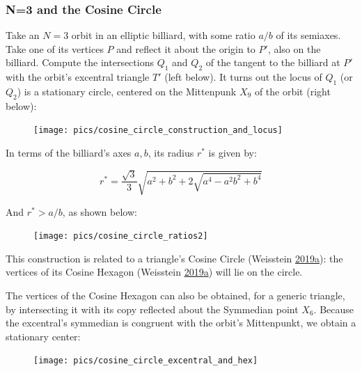 \documentclass[]{article}
\begin{document}
\hypertarget{n3-and-the-cosine-circle}{%
\subsubsection{N=3 and the Cosine Circle}\label{n3-and-the-cosine-circle}}

Take an \(N=3\) orbit in an elliptic billiard, with some ratio \(a/b\) of its semiaxes. Take one of its vertices \(P\) and reflect it about the origin to \(P'\), also on the billiard. Compute the intersections \(Q_1\) and \(Q_2\) of the tangent to the billiard at \(P'\) with the orbit's excentral triangle \(T'\) (left below). It turns out the locus of \(Q_1\) (or \(Q_2\)) is a stationary circle, centered on the Mittenpunk \(X_9\) of the orbit (right below):

\begin{figure}[H]

{\centering \texttt{[image: pics/cosine\_circle\_construction\_and\_locus]} 

}

\end{figure}

In terms of the billiard's axes \(a,b\), its radius \(r^*\) is given by:

\[
r^* = \frac{\sqrt{3}}{3}\sqrt{a^2+b^2+ 2\sqrt{a^4-a^2 b^2+b^4}}
\]

And \(r^*>a/b\), as shown below:

\begin{figure}[H]

{\centering \texttt{[image: pics/cosine\_circle\_ratios2]} 

}

\end{figure}

This construction is related to a triangle's Cosine Circle (Weisstein \protect\hyperlink{ref-mw}{2019}\protect\hyperlink{ref-mw}{a}): the vertices of its Cosine Hexagon (Weisstein \protect\hyperlink{ref-mw}{2019}\protect\hyperlink{ref-mw}{a}) will lie on the circle.

The vertices of the Cosine Hexagon can also be obtained, for a generic triangle, by intersecting it with its copy reflected about the Symmedian point \(X_6\). Because the excentral's symmedian is congruent with the orbit's Mittenpunkt, we obtain a stationary center:

\begin{figure}[H]

{\centering \texttt{[image: pics/cosine\_circle\_excentral\_and\_hex]} 

}

\end{figure}
\end{document}
